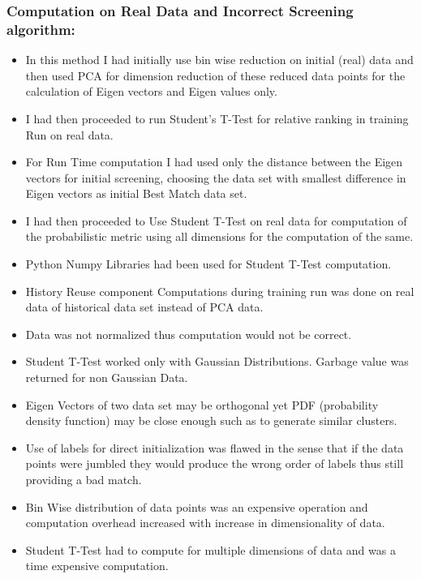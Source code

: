 \documentclass{vldb}
\begin{document}
\subsubsection{Computation on Real Data and Incorrect Screening algorithm:}
\begin{itemize}
    \item In this method I had initially use bin wise reduction on initial (real) data and then used PCA for dimension reduction of these reduced data points for the calculation of Eigen vectors and Eigen values only.
    \item I had then proceeded to run Student’s T-Test for relative ranking in training Run on real data.
    \item For Run Time computation I had used only the distance between the Eigen vectors for initial screening, choosing the data set with smallest difference in Eigen vectors as initial Best Match data set.
    \item I had then proceeded to Use Student T-Test on real data for computation of the probabilistic metric using all dimensions for the computation of the same.
    \item Python Numpy Libraries had been used for Student T-Test computation.
    \item History Reuse component Computations during training run was done on real data of historical data set instead of PCA data.
\end{itemize}

\begin{itemize}
    \item Data was not normalized thus computation would not be correct.
    \item Student T-Test worked only with Gaussian Distributions. Garbage value was returned for non Gaussian Data.
    \item Eigen Vectors of two data set may be orthogonal yet PDF (probability density function) may be close enough such as to generate similar clusters.
    \item Use of labels for direct initialization was flawed in the sense that if the data points were jumbled they would produce the wrong order of labels thus still providing a bad match.
    \item Bin Wise distribution of data points was an expensive operation and computation overhead increased with increase in dimensionality of data.
    \item Student T-Test had to compute for multiple dimensions of data and was a time expensive computation.
\end{itemize}
\end{document}
